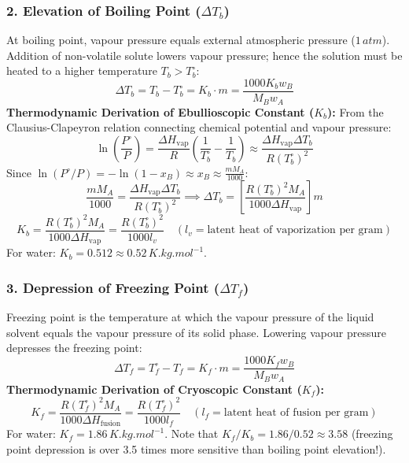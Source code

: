 \documentclass[10pt,twoside,openright]{book}
\begin{document}
\subsubsection{2. Elevation of Boiling Point ($\Delta T_b$)}
At boiling point, vapour pressure equals external atmospheric pressure ($1\,\si{atm}$). Addition of non-volatile solute lowers vapour pressure; hence the solution must be heated to a higher temperature $T_b > T_b^\circ$:
\begin{equation}
  \Delta T_b = T_b - T_b^\circ = K_b \cdot m = \frac{1000 K_b w_B}{M_B w_A}
\end{equation}
\textbf{Thermodynamic Derivation of Ebullioscopic Constant ($K_b$):}
From the Clausius-Clapeyron relation connecting chemical potential and vapour pressure:
\begin{equation}
  \ln\left(\frac{P^\circ}{P}\right) = \frac{\Delta H_{\text{vap}}}{R}\left(\frac{1}{T_b^\circ} - \frac{1}{T_b}\right) \approx \frac{\Delta H_{\text{vap}} \Delta T_b}{R (T_b^\circ)^2}
\end{equation}
Since $\ln(P^\circ / P) = -\ln(1 - x_B) \approx x_B \approx \frac{m M_A}{1000}$:
\begin{equation}
  \frac{m M_A}{1000} = \frac{\Delta H_{\text{vap}} \Delta T_b}{R (T_b^\circ)^2} \implies \Delta T_b = \left[\frac{R (T_b^\circ)^2 M_A}{1000 \Delta H_{\text{vap}}}\right] m
\end{equation}
\begin{equation}
  K_b = \frac{R (T_b^\circ)^2 M_A}{1000 \Delta H_{\text{vap}}} = \frac{R (T_b^\circ)^2}{1000 l_v} \quad (l_v = \text{latent heat of vaporization per gram})
\end{equation}
For water: $K_b = 0.512 \approx 0.52\,\si{K.kg.mol^{-1}}$.

\subsubsection{3. Depression of Freezing Point ($\Delta T_f$)}
Freezing point is the temperature at which the vapour pressure of the liquid solvent equals the vapour pressure of its solid phase. Lowering vapour pressure depresses the freezing point:
\begin{equation}
  \Delta T_f = T_f^\circ - T_f = K_f \cdot m = \frac{1000 K_f w_B}{M_B w_A}
\end{equation}
\textbf{Thermodynamic Derivation of Cryoscopic Constant ($K_f$):}
\begin{equation}
  K_f = \frac{R (T_f^\circ)^2 M_A}{1000 \Delta H_{\text{fusion}}} = \frac{R (T_f^\circ)^2}{1000 l_f} \quad (l_f = \text{latent heat of fusion per gram})
\end{equation}
For water: $K_f = 1.86\,\si{K.kg.mol^{-1}}$. Note that $K_f / K_b = 1.86 / 0.52 \approx 3.58$ (freezing point depression is over 3.5 times more sensitive than boiling point elevation!).
\end{document}
